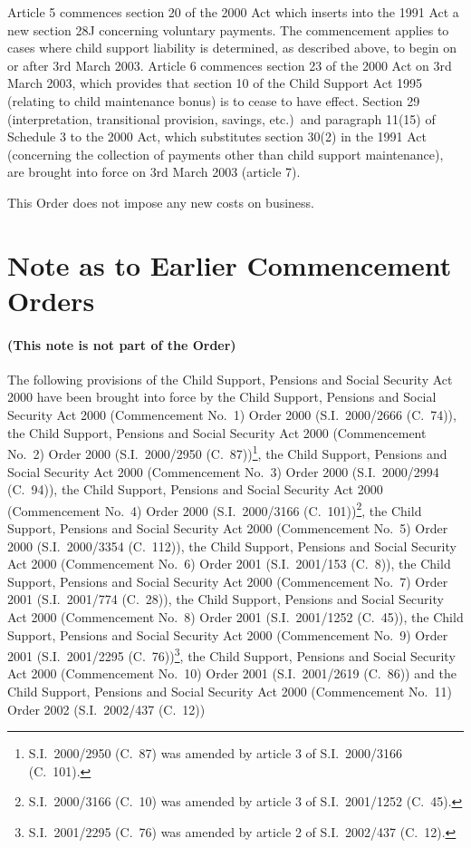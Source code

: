 \documentclass[12pt,a4paper]{article}
\begin{document}
Article 5 commences section 20 of the 2000 Act which inserts into the 1991 Act a new section 28J concerning voluntary payments. The commencement applies to cases where child support liability is determined, as described above, to begin on or after 3rd March 2003. Article 6 commences section 23 of the 2000 Act on 3rd March 2003, which provides that section 10 of the Child Support Act 1995 (relating to child maintenance bonus) is to cease to have effect. Section 29 (interpretation, transitional provision, savings, etc.)\ and paragraph 11(15) of Schedule 3 to the 2000 Act, which substitutes section 30(2) in the 1991 Act (concerning the collection of payments other than child support maintenance), are brought into force on 3rd March 2003 (article 7).

This Order does not impose any new costs on business. 

\part{Note as to Earlier Commencement Orders}

\renewcommand\parthead{— Note as to Earlier Commencement Orders}

\subsection*{(This note is not part of the Order)}

The following provisions of the Child Support, Pensions and Social Security Act 2000 have been brought into force by the Child Support, Pensions and Social Security Act 2000 (Commencement No.\ 1) Order 2000 (S.I.\ 2000/2666 (C.\ 74)), the Child Support, Pensions and Social Security Act 2000 (Commencement No.\ 2) Order 2000 (S.I.\ 2000/2950 (C.\ 87))\footnote{S.I.\ 2000/2950 (C.\ 87) was amended by article 3 of S.I.\ 2000/3166 (C.\ 101).}, the Child Support, Pensions and Social Security Act 2000 (Commencement No.\ 3) Order 2000 (S.I.\ 2000/2994 (C.\ 94)), the Child Support, Pensions and Social Security Act 2000 (Commencement No.\ 4) Order 2000 (S.I.\ 2000/3166 (C.\ 101))\footnote{S.I.\ 2000/3166 (C.\ 10) was amended by article 3 of S.I.\ 2001/1252 (C.\ 45).}, the Child Support, Pensions and Social Security Act 2000 (Commencement No.\ 5) Order 2000 (S.I.\ 2000/3354 (C.\ 112)), the Child Support, Pensions and Social Security Act 2000 (Commencement No.\ 6) Order 2001 (S.I.\ 2001/153 (C.\ 8)), the Child Support, Pensions and Social Security Act 2000 (Commencement No.\ 7) Order 2001 (S.I.\ 2001/774 (C.\ 28)), the Child Support, Pensions and Social Security Act 2000 (Commencement No.\ 8) Order 2001 (S.I.\ 2001/1252 (C.\ 45)), the Child Support, Pensions and Social Security Act 2000 (Commencement No.\ 9) Order 2001 (S.I.\ 2001/2295 (C.\ 76))\footnote{S.I.\ 2001/2295 (C.\ 76) was amended by article 2 of S.I.\ 2002/437 (C.\ 12).}, the Child Support, Pensions and Social Security Act 2000 (Commencement No.\ 10) Order 2001 (S.I.\ 2001/2619 (C.\ 86)) and the Child Support, Pensions and Social Security Act 2000 (Commencement No.\ 11) Order 2002 (S.I.\ 2002/437 (C.\ 12))
\end{document}
